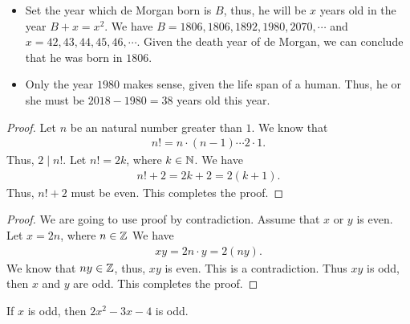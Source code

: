 \documentclass[8pt,twocolumn]{article}
\begin{document}
\begin{Answer}[number=2.2.4]
  \begin{itemize}
    \item Set the year which de Morgan born is $B$, thus, he will be $x$ years
      old in the year $B+x = x^2$. We have $B=1806, 1806, 1892, 1980, 2070,\cdots$ and
      $x=42,43,44,45,46,\cdots$. Given the death year of de Morgan, we can conclude that
      he was born in $1806$.
    \item Only the year $1980$ makes sense, given the life span of a human.
      Thus, he or she must be $2018-1980=38$ years old this year.
  \end{itemize}
\end{Answer}

\begin{Answer}[number=2.2.5]
  \begin{proof}
    Let $n$ be an natural number greater than $1$. We know that
    \begin{align*}
      n! = n\cdot (n-1) \cdots 2 \cdot 1.
    \end{align*}
    Thus, $2\mid n!$. Let $n! = 2k$, where $k\in \mathbb{N}$. We have
    \begin{align*}
      n! + 2 = 2k+2 = 2(k+1).
    \end{align*}
    Thus, $n!+2$ must be even. This completes the proof.
  \end{proof}
\end{Answer}

\begin{Answer}[number=2.2.6]
  \begin{proof}
    We are going to use proof by contradiction. Assume that $x$ or $y$ is even.
    Let $x = 2n$, where $n\in \mathbb{Z}$
    We have
    \begin{align*}
      xy = 2n \cdot y = 2(ny).
    \end{align*}
    We know that $ny\in \mathbb{Z}$, thus, $xy$ is even. This is a contradiction. Thus
    $xy$ is odd, then $x$ and $y$ are odd. This completes the proof.
  \end{proof}
\end{Answer}

\begin{Answer}[number=2.2.8]
  If $x$ is odd, then $2x^2 - 3x - 4$ is odd.
\end{Answer}
\end{document}
